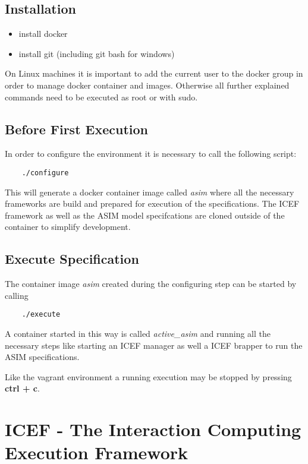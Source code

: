 \subsection{Installation}

\begin{itemize}
	\item install docker
	\item install git (including git bash for windows)
\end{itemize}

On Linux machines it is important to add the current user to the docker group in order to manage docker container and images. Otherwise all further explained commands need to be executed as root or with sudo.

\subsection{Before First Execution}

In order to configure the environment it is necessary to call the following script:

\begin{lstlisting}
	./configure
\end{lstlisting}

This will generate a docker container image called \textit{asim} where all the necessary frameworks are build and prepared for execution of the specifications. The ICEF framework as well as the ASIM model specifcations are cloned outside of the container to simplify development.

\subsection{Execute Specification}

The container image \textit{asim} created during the configuring step can be started by calling

\begin{lstlisting}
	./execute
\end{lstlisting}

A container started in this way is called \textit{active\_asim} and running all the necessary steps like starting an ICEF manager as well a ICEF brapper to run the ASIM specifications.

Like the vagrant environment a running execution may be stopped by pressing \textbf{ctrl + c}.

\section{ICEF - The Interaction Computing Execution Framework}
\label{sec:icef-intro}

